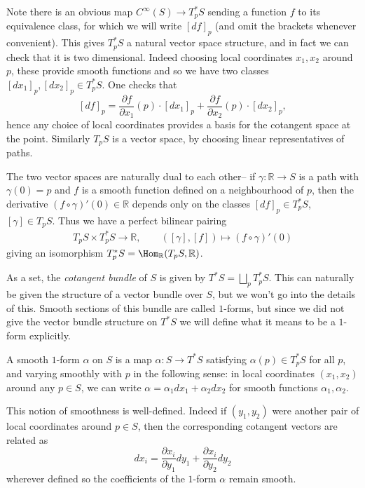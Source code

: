 Note there is an obvious map \(C^\infty(S)\to T_p^\ast S\) sending a function
\(f\) to its equivalence class, for which we will write \([df]_p\) (and omit
the brackets whenever convenient). This gives \(T_p^\ast S\) a natural vector
space structure, and in fact we can check that it is two dimensional. Indeed
choosing local coordinates \(x_1,x_2\) around \(p\), these provide smooth
functions and so we have two classes \([dx_1]_p, [dx_2]_p\in T_p^\ast S\). One checks that
\[
    [df]_p = \frac{\partial f}{\partial x_1}(p)\cdot [dx_1]_p + \frac{\partial
    f}{\partial x_2}(p)\cdot [dx_2]_p,
\]
hence any choice of local coordinates provides a basis for the cotangent space
at the point. Similarly \(T_pS\) is a vector space, by choosing linear representatives of paths.

The two vector spaces are naturally dual to each other-- if
\(\gamma:\mathbb{R}\to S\) is a path with \(\gamma(0)=p\) and \(f\) is a smooth
function defined on a neighbourhood of \(p\), then the derivative \((f\circ
\gamma)'(0)\in \mathbb{R}\) depends only on the classes \([df]_p\in T_p^\ast
S\), \([\gamma]\in T_pS\). Thus we have a perfect bilinear pairing
\begin{align*}
    T_pS\times T_p^\ast S \to \mathbb{R}, \qquad
    ([\gamma], [f]) \mapsto (f\circ\gamma)'(0)
\end{align*}
giving an isomorphism \(T_p^\ast S=\Hom_\mathbb{R}(T_pS, \mathbb{R})\).

As a set, the \textit{cotangent bundle} of \(S\) is given by \(T^\ast
S=\bigsqcup_p T^\ast_pS\). This can naturally be given the structure of a vector
bundle over \(S\), but we won't go into the details of this. Smooth sections of
this bundle are called \(1\)-forms, but since we did not give the vector
bundle structure on \(T^\ast S\) we will define what it means to be a
\(1\)-form explicitly.

\begin{definition}
    A smooth \(1\)-form \(\alpha\) on \(S\) is a map \(\alpha:S\to T^\ast S\)
    satisfying \(\alpha(p)\in T_p^\ast S\) for all \(p\), and varying smoothly
    with \(p\) in the following sense: in local coordinates \((x_1,x_2)\)
    around any \(p\in S\), we can write \(\alpha=\alpha_1 dx_1 + \alpha_2 dx_2\)
    for smooth functions \(\alpha_1, \alpha_2\).
\end{definition}

This notion of smoothness is well-defined. Indeed if \((y_1,y_2)\) were another
pair of local coordinates around \(p\in S\), then the corresponding cotangent
vectors are related as
\[
    dx_i  = \frac{\partial x_i}{\partial y_1}dy_1 + \frac{\partial x_i}{\partial
    y_2} dy_2
\]
wherever defined so the coefficients of the \(1\)-form \(\alpha\) remain smooth.

